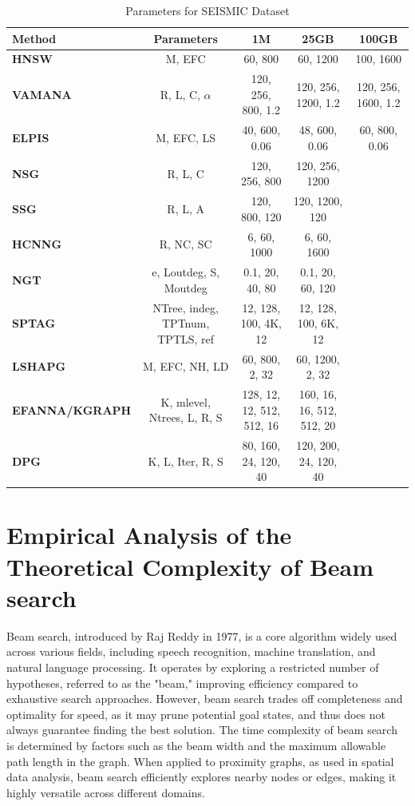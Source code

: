 \begin{table}[h!]
\centering
\caption{Parameters for SEISMIC Dataset}
\scriptsize
\begin{tabularx}{\textwidth}{lCCCC}
\toprule
\textbf{Method} & \textbf{Parameters} & \textbf{1M} & \textbf{25GB} & \textbf{100GB} \\
\midrule
\textbf{HNSW} & M, EFC & 60, 800 & 60, 1200 & 100, 1600 \\
\textbf{VAMANA} & R, L, C, $\alpha$ & 120, 256, 800, 1.2 & 120, 256, 1200, 1.2 & 120, 256, 1600, 1.2 \\
\textbf{ELPIS} & M, EFC, LS & 40, 600, 0.06 & 48, 600, 0.06 & 60, 800, 0.06 \\
\textbf{NSG} & R, L, C & 120, 256, 800 & 120, 256, 1200 & \\
\textbf{SSG} & R, L, A & 120, 800, 120 & 120, 1200, 120 & \\
\textbf{HCNNG} & R, NC, SC & 6, 60, 1000 & 6, 60, 1600 & \\
\textbf{NGT} & e, Loutdeg, S, Moutdeg & 0.1, 20, 40, 80 & 0.1, 20, 60, 120 & \\
\textbf{SPTAG} & NTree, indeg, TPTnum, TPTLS, ref & 12, 128, 100, 4K, 12 & 12, 128, 100, 6K, 12 & \\
\textbf{LSHAPG} & M, EFC, NH, LD & 60, 800, 2, 32 & 60, 1200, 2, 32 & \\
\textbf{EFANNA/KGRAPH} & K, mlevel, Ntrees, L, R, S & 128, 12, 12, 512, 512, 16 & 160, 16, 16, 512, 512, 20 & \\
\textbf{DPG} & K, L, Iter, R, S & 80, 160, 24, 120, 40 & 120, 200, 24, 120, 40 & \\
\bottomrule
\end{tabularx}
\end{table}


\chapter{Empirical Analysis of the Theoretical Complexity of Beam search}
\label{appendix:beamsearch}
Beam search, introduced by Raj Reddy in 1977, is a core algorithm widely used across various fields, including speech recognition, machine translation, and natural language processing. It operates by exploring a restricted number of hypotheses, referred to as the "beam," improving efficiency compared to exhaustive search approaches. However, beam search trades off completeness and optimality for speed, as it may prune potential goal states, and thus does not always guarantee finding the best solution. The time complexity of beam search is determined by factors such as the beam width and the maximum allowable path length in the graph. When applied to proximity graphs, as used in spatial data analysis, beam search efficiently explores nearby nodes or edges, making it highly versatile across different domains.

